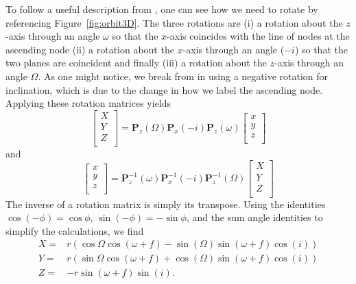 \documentclass[modern]{aastex61}
\begin{document}
To follow a useful description from \citet{murray10}, one can see how we need to rotate by referencing Figure~\ref{fig:orbit3D}. The three rotations are (i) a rotation about the $z$-axis through an angle $\omega$ so that the $x$-axis coincides with the line of nodes at the ascending node (ii) a rotation about the $x$-axis through an angle ($-i$) so that the two planes are coincident and finally (iii) a rotation about the $z$-axis through an angle $\Omega$. As one might notice, we break from \citet{murray10} in using a negative rotation for inclination, which is due to the change in how we label the ascending node. Applying these rotation matrices yields
\begin{equation}
  \left [ \begin{array}{c}
  X \\
  Y \\
  Z \\
\end{array}
  \right ] =
  {\bm P}_z (\Omega) {\bm P}_x(-i) {\bm P}_z(\omega)
  \left [
  \begin{array}{c}
  x \\
  y \\
  z \\
  \end{array}
  \right]
\end{equation}
and
\begin{equation}
  \left [
  \begin{array}{c}
    x \\
    y \\
    z \\
  \end{array} \right ]
  =
  {\bm P}_z^{-1}(\omega) {\bm P}_x^{-1}(-i) {\bm P}_z^{-1}(\Omega)
  \left [
  \begin{array}{c}
    X \\
    Y \\
    Z \\
    \end{array}
  \right ]
\end{equation}
The inverse of a rotation matrix is simply its transpose. Using the identities $\cos(- \phi ) = \cos \phi$, $\sin(- \phi) = -\sin \phi$, and the sum angle identities to simplify the calculations, we find
\begin{equation}
  \begin{array}{lc}
    X =& r (\cos \Omega \cos(\omega + f) - \sin(\Omega) \sin(\omega + f) \cos(i)) \\
    Y =& r (\sin \Omega \cos(\omega + f) + \cos(\Omega) \sin(\omega + f) \cos(i)) \\
    Z =& - r \sin(\omega + f) \sin(i).\\
\end{array}
\label{eqn:Z}
\end{equation}
\end{document}
